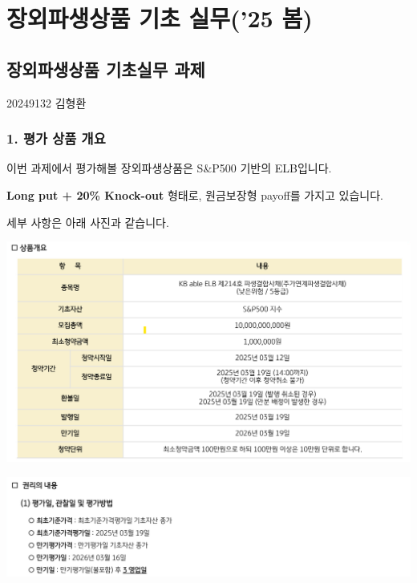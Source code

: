 \documentclass[
  a4paper,
  DIV=11,
  numbers=noendperiod]{scrreprt}
\begin{document}
\part{장외파생상품 기초 실무('25 봄)}

\chapter*{장외파생상품 기초실무
과제}\label{uxc7a5uxc678uxd30cuxc0dduxc0c1uxd488-uxae30uxcd08uxc2e4uxbb34-uxacfcuxc81c}


20249132 김형환

\section*{1. 평가 상품
개요}\label{uxd3c9uxac00-uxc0c1uxd488-uxac1cuxc694}


이번 과제에서 평가해볼 장외파생상품은 S\&P500 기반의 ELB입니다.

\textbf{Long put + 20\% Knock-out} 형태로, 원금보장형 payoff를 가지고
있습니다.

세부 사항은 아래 사진과 같습니다.

\includegraphics{image/elb1.png}

\includegraphics{image/elb2.png}
\end{document}
